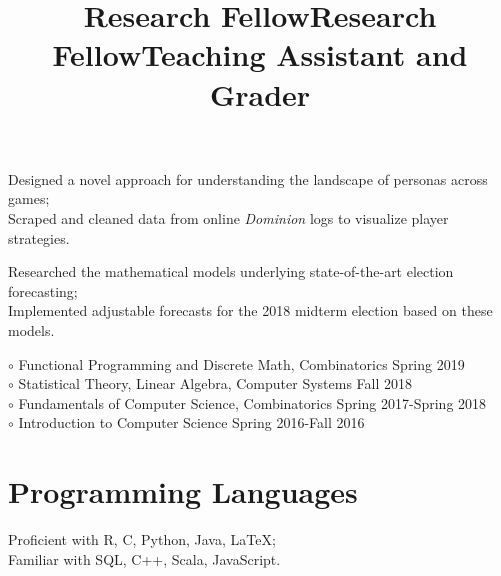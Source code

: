 \documentclass[margin]{res}
\begin{document}
\begin{resume}
\title{\textbf{Research Fellow}}
\begin{position}
Designed a novel approach for understanding the landscape of personas across games;\\
Scraped and cleaned data from online \emph{Dominion} logs to visualize player strategies.
\end{position}

\title{\textbf{Research Fellow}}
\begin{position}
Researched the mathematical models underlying state-of-the-art election forecasting;\\
Implemented adjustable forecasts for the 2018 midterm election based on these models.
\end{position}

\dates{}
\title{\textbf{Teaching Assistant and Grader}}
\begin{position}
$\circ$  Functional Programming and Discrete Math, Combinatorics \hfill Spring 2019\\
$\circ$ Statistical Theory, Linear Algebra, Computer Systems \hfill Fall 2018\\
$\circ$  Fundamentals of Computer Science, Combinatorics \hfill Spring 2017-Spring 2018\\
$\circ$ Introduction to Computer Science \hfill Spring 2016-Fall 2016
\end{position}



\section{Programming Languages}

Proficient with R, C, Python, Java, \LaTeX;\\ Familiar with SQL, C++, Scala, JavaScript.



\end{resume}
\end{document}

